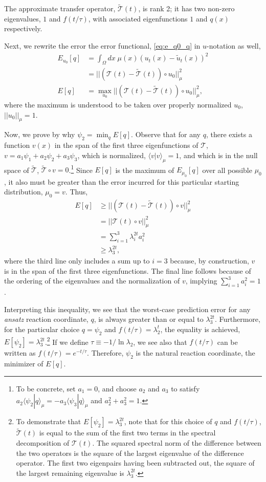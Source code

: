 \documentclass[aip, jcp, reprint, nolinenumbers, twocolumn, nobalancelastpage, nofootinbib]{revtex4-1}
\begin{document}
The approximate transfer operator, $\tilde{\mathcal{T}}(t)$, is rank 2; it has two non-zero eigenvalues, $1$ and $f(t/\tau)$, with associated eigenfunctions $1$ and $q(x)$ respectively.

Next, we rewrite the error the error functional, \cref{eq:e_q0_q} in $u$-notation as well,
\begin{align}
E_{u_0}[q] &=  \int_\Omega dx\; \mu(x) (u_t(x) - \tilde{u}_t(x))^2 \\
&= || (\mathcal{T}(t) - \tilde{\mathcal{T}}(t)) \circ u_0 ||_\mu^2 \\
E[q] &= \max_{u_0} || (\mathcal{T}(t) - \tilde{\mathcal{T}}(t)) \circ u_0 ||_\mu^2,
\end{align}
where the maximum is understood to be taken over properly normalized $u_0$, $||u_0||_\mu = 1$.

Now, we prove by why $\psi_2 = \min_q E[q]$. Observe that for any $q$, there exists a function $v(x)$ in the span of the first three eigenfunctions of $\mathcal{T}$, $v=a_1 \psi_1+ a_2 \psi_2 + a_3 \psi_3$, which is normalized, $\langle v | v \rangle_\mu = 1$, and which is in the null space of $\tilde{\mathcal{T}}$, $\tilde{\mathcal{T}} \circ v = 0$.\footnote{To be concrete, set $a_1 = 0$, and choose $a_2$ and $a_3$ to satisfy $a_2 \langle \psi_2 | q \rangle_\mu  = - a_3 \langle \psi_3 | q \rangle_\mu$ and $a_2^2 + a_3^2 = 1$.} Since $E[q]$ is the maximum of $E_{\mu_0}[q]$ over all possible $\mu_0$, it also must be greater than the error incurred for this particular starting distribution, $\mu_0=v$. Thus,
\begin{align}
E[q] &\geq || (\mathcal{T}(t) - \tilde{\mathcal{T}}(t)) \circ v ||_\mu^2 \\
&= || \mathcal{T}(t) \circ v ||_\mu^2 \\
&= \sum_{i=1}^3 \lambda_i^{2t} a_i^2 \\
&\geq \lambda_3^{2t},
\end{align}
where the third line only includes a sum up to $i=3$ because, by construction, $v$ is in the span of the first three eigenfunctions. The final line follows because of the ordering of the eigenvalues and the normalization of $v$, implying $\sum_{i=1}^3 a_i^2 = 1$.

Interpreting this inequality, we see that the worst-case prediction error for any \emph{ansatz} reaction coordinate, $q$, is always greater than or equal to $\lambda_3^{2t}$. Furthermore, for the particular choice $q=\psi_2$ and $f(t/\tau)=\lambda_2^t$, the equality is achieved, $E[\psi_2] = \lambda_3^{2t}$.\footnote{To demonstrate that $E[\psi_2] = \lambda_3^{2t}$, note that for this choice of $q$ and $f(t/\tau)$, $\tilde{\mathcal{T}}(t)$ is equal to the sum of the first two terms in the spectral decomposition of $\mathcal{T}(t)$. The squared spectral norm of the difference between the two operators is the square of the largest eigenvalue of the difference operator. The first two eigenpairs having been subtracted out, the square of the largest remaining eigenvalue is $\lambda_3^{2t}$.} If we define $\tau \equiv -1/\ln \lambda_2$, we see also that $f(t/\tau)$ can be written as $f(t/\tau) = e^{-t/\tau}$. Therefore, $\psi_2$ is the natural reaction coordinate, the minimizer of $E[q]$.
\end{document}
